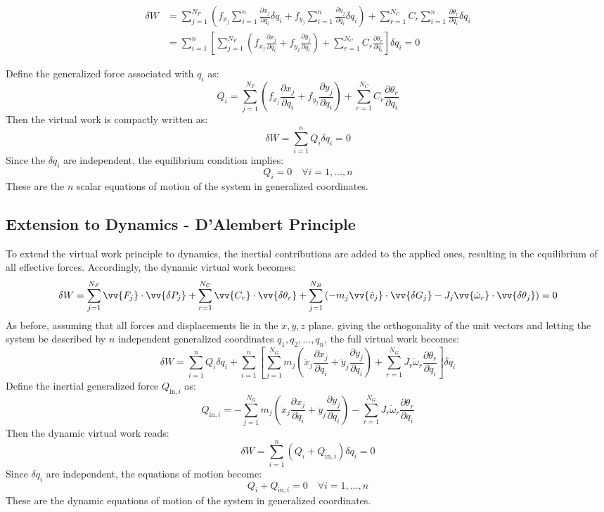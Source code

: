 \begin{align*}
    \delta W &= \sum_{j=1}^{N_F} \left( f_{x_j} \sum_{i=1}^n \frac{\partial x_j}{\partial q_i} \delta q_i + f_{y_j} \sum_{i=1}^n \frac{\partial y_j}{\partial q_i} \delta q_i \right) + \sum_{r=1}^{N_C} C_r \sum_{i=1}^n \frac{\partial \theta_r}{\partial q_i} \delta q_i \\
    &= \sum_{i=1}^n \left[ \sum_{j=1}^{N_F} \left( f_{x_j} \frac{\partial x_j}{\partial q_i} + f_{y_j} \frac{\partial y_j}{\partial q_i} \right) + \sum_{r=1}^{N_C} C_r \frac{\partial \theta_r}{\partial q_i} \right] \delta q_i = 0
\end{align*}

Define the generalized force associated with \( q_i \) as:
\[
Q_i = \sum_{j=1}^{N_F} \left( f_{x_j} \frac{\partial x_j}{\partial q_i} + f_{y_j} \frac{\partial y_j}{\partial q_i} \right) + \sum_{r=1}^{N_C} C_r \frac{\partial \theta_r}{\partial q_i}
\]
Then the virtual work is compactly written as:
\[
\delta W = \sum_{i=1}^n Q_i \delta q_i = 0
\]
Since the \( \delta q_i \) are independent, the equilibrium condition implies:
\[
Q_i = 0 \quad \forall i = 1, \dots, n
\]
These are the \( n \) scalar equations of motion of the system in generalized coordinates.

\subsection{Extension to Dynamics - D’Alembert Principle} 

To extend the virtual work principle to dynamics, the inertial contributions are added to the applied ones, resulting in the equilibrium of all effective forces. Accordingly, the dynamic virtual work becomes:
\[
\delta W = \sum_{j=1}^{N_F} \vv{F_j} \cdot \vv{\delta P_j} + \sum_{r=1}^{N_C} \vv{C_r} \cdot \vv{\delta \theta_r} + \sum_{j=1}^{N_B} \left( -m_j \vv{\dot{v}_j} \cdot \vv{\delta G_j} -J_j \vv{\dot{\omega}_r} \cdot \vv{\delta \theta_j} \right) = 0
\]
As before, assuming that all forces and displacements lie in the \( x, y, z \) plane, giving the orthogonality of the unit vectors and letting the system be described by \( n \) independent generalized coordinates \( q_1, q_2, \ldots, q_n \), the full virtual work becomes:
\[
\delta W = \sum_{i=1}^n Q_i \delta q_i 
+ \sum_{i=1}^n \left[ \sum_{j=1}^{N_G} m_j \left( \ddot{x}_j \frac{\partial x_j}{\partial q_i} + \ddot{y}_j \frac{\partial y_j}{\partial q_i} \right)
+ \sum_{r=1}^{N_G} J_r  \dot{\omega}_r \frac{\partial \theta_r}{\partial q_i} \right] \delta q_i
\]
Define the inertial generalized force \( Q_{\text{in},i} \) as:
\[
Q_{\text{in},i} = - \sum_{j=1}^{N_G} m_j \left( \ddot{x}_j \frac{\partial x_j}{\partial q_i} + \ddot{y}_j \frac{\partial y_j}{\partial q_i} \right)
- \sum_{r=1}^{N_G} J_r  \dot{\omega}_r \frac{\partial \theta_r}{\partial q_i}
\]
Then the dynamic virtual work reads:
\[
\delta W = \sum_{i=1}^n \left( Q_i + Q_{\text{in},i} \right) \delta q_i = 0
\]
Since \( \delta q_i \) are independent, the equations of motion become:
\[
Q_i + Q_{\text{in},i} = 0 \quad \forall i = 1, \dots, n
\]
These are the dynamic equations of motion of the system in generalized coordinates.

